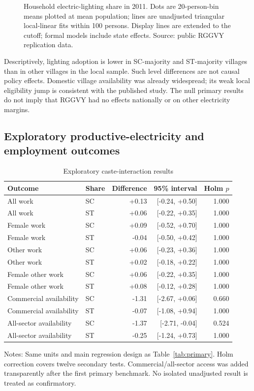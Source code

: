 \documentclass[11pt,a4paper]{article}
\begin{document}
\begin{figure}[htbp]
\caption{Household electric-lighting share in 2011. Dots are 20-person-bin means plotted at mean population; lines are unadjusted triangular local-linear fits within 100 persons. Display lines are extended to the cutoff; formal models include state effects. Source: public RGGVY replication data.}
\label{fig:rdd}
\end{figure}

Descriptively, lighting adoption is lower in SC-majority and ST-majority villages than in other villages in the local sample. Such level differences are not causal policy effects. Domestic village availability was already widespread; its weak local eligibility jump is consistent with the published study. The null primary results do not imply that RGGVY had no effects nationally or on other electricity margins.

\subsection{Exploratory productive-electricity and employment outcomes}
\begin{table}[htbp]\centering\small
\caption{Exploratory caste-interaction results}
\label{tab:secondary}
\begin{tabular}{llrrr}\toprule
Outcome & Share & Difference & 95\% interval & Holm $p$ \\ \midrule
All work & SC & +0.13 & [-0.24, +0.50] & 1.000 \\
All work & ST & +0.06 & [-0.22, +0.35] & 1.000 \\
Female work & SC & +0.09 & [-0.52, +0.70] & 1.000 \\
Female work & ST & -0.04 & [-0.50, +0.42] & 1.000 \\
Other work & SC & +0.06 & [-0.23, +0.36] & 1.000 \\
Other work & ST & +0.02 & [-0.18, +0.22] & 1.000 \\
Female other work & SC & +0.06 & [-0.22, +0.35] & 1.000 \\
Female other work & ST & +0.08 & [-0.12, +0.28] & 1.000 \\
Commercial availability & SC & -1.31 & [-2.67, +0.06] & 0.660 \\
Commercial availability & ST & -0.07 & [-1.08, +0.94] & 1.000 \\
All-sector availability & SC & -1.37 & [-2.71, -0.04] & 0.524 \\
All-sector availability & ST & -0.25 & [-1.24, +0.73] & 1.000 \\
\bottomrule\end{tabular}
\par\smallskip\footnotesize\raggedright
Notes: Same units and main regression design as Table~\ref{tab:primary}. Holm correction covers twelve secondary tests. Commercial/all-sector access was added transparently after the first primary benchmark. No isolated unadjusted result is treated as confirmatory.
\end{table}
\end{document}
